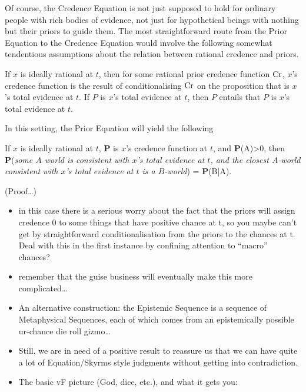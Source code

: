 \documentclass[If.tex]{subfiles}
\begin{document}
Of course, the Credence Equation is not just supposed to hold for ordinary people with rich bodies of evidence, not just for hypothetical beings with nothing but their priors to guide them. The most straightforward route from the Prior Equation to the Credence Equation would involve the following somewhat tendentious assumptions about the relation between rational credence and priors.
\begin{prop}
\litem[Conditionalisation]
	If $x$ is ideally rational at $t$, then for some rational prior credence function $\operatorname{Cr}$, $x$'s credence function is the result of conditionalising $\operatorname{Cr}$ on the proposition that is $x$'s total evidence at $t$. 
\litem[Introspection]
	If $P$ is $x$'s total evidence at $t$, then $P$ entails that $P$ is $x$'s total evidence at $t$. 
\end{prop}
In this setting, the Prior Equation will yield the following
\begin{prop}
	If $x$ is ideally rational at $t$, \textbf{P} is $x$'s credence function at $t$, and \textbf{P}(A)>0, then \textbf{P}(\emph{some $A$ world is consistent with $x$'s total evidence at $t$, and the closest $A$-world consistent with $x$'s total evidence at $t$ is a $B$-world}) = \textbf{P}(B|A). 
\end{prop}

(Proof\ldots{})

\begin{itemize}
\item
  in this case there is a serious worry about the fact that the priors
  will assign credence 0 to some things that have positive chance at t,
  so you maybe can't get by straightforward conditionalisation from the
  priors to the chances at t. Deal with this in the first instance by
  confining attention to “macro” chances?\\
\item
  remember that the guise business will eventually make this more
  complicated\ldots{}
\item
  An alternative construction: the Epistemic Sequence is a sequence of
  Metaphysical Sequences, each of which comes from an epistemically
  possible ur-chance die roll gizmo\ldots{}
\item
  Still, we are in need of a positive result to reassure us that we can
  have quite a lot of Equation/Skyrms style judgments without getting
  into contradiction.
\item
  The basic vF picture (God, dice, etc.), and what it gets you:
\end{itemize}
\end{document}
